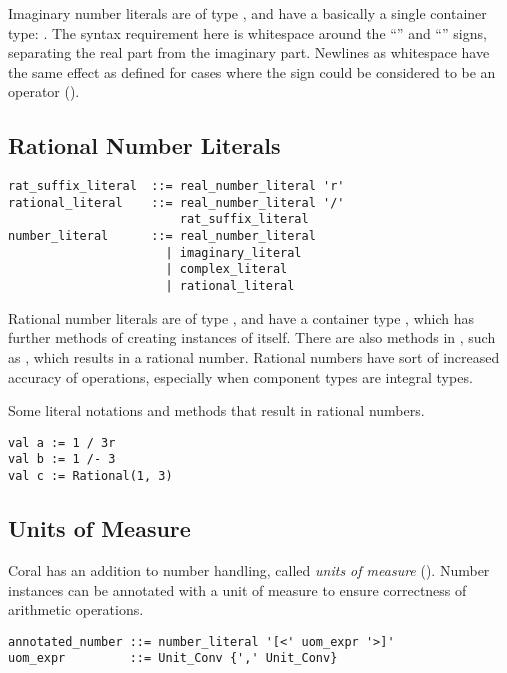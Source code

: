 Imaginary number literals are of type , and have a basically a single container type: . The syntax requirement here is whitespace around the ``\code{+}'' and ``\code{+}'' signs, separating the real part from the imaginary part. Newlines as whitespace have the same effect as defined for cases where the sign could be considered to be an operator ().





\subsection{Rational Number Literals}
\label{sec:rationalliterals}

\syntax\begin{lstlisting}
rat_suffix_literal  ::= real_number_literal 'r'
rational_literal    ::= real_number_literal '/' 
                        rat_suffix_literal
number_literal      ::= real_number_literal
	                  | imaginary_literal
	                  | complex_literal
	                  | rational_literal
\end{lstlisting}

Rational number literals are of type , and have a container type , which has further methods of creating instances of itself. There are also methods in , such as \code{/-}, which results in a rational number. Rational numbers have sort of increased accuracy of operations, especially when component types are integral types. 

\example Some literal notations and methods that result in rational numbers. 
\begin{lstlisting}
val a := 1 / 3r
val b := 1 /- 3
val c := Rational(1, 3)
\end{lstlisting}





\subsection{Units of Measure}
\label{sec:unitsofmeasuresyntax}

Coral has an addition to number handling, called {\em units of measure} (). Number instances can be annotated with a unit of measure to ensure correctness of arithmetic operations. 

\syntax\begin{lstlisting}
annotated_number ::= number_literal '[<' uom_expr '>]'
uom_expr         ::= Unit_Conv {',' Unit_Conv}
\end{lstlisting}

